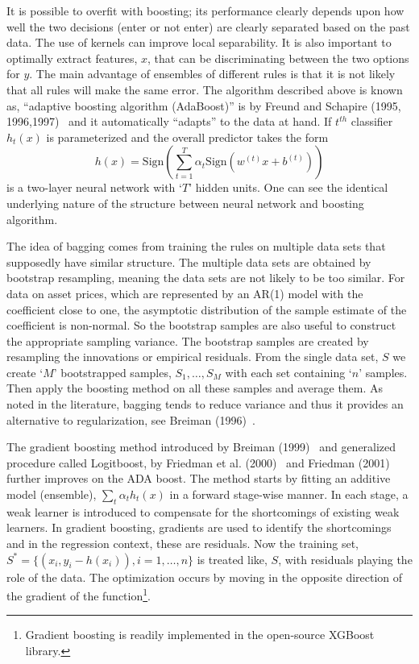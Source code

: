  
It is possible to overfit with boosting; its performance clearly depends upon how well the two decisions (enter or not enter) are clearly separated based on the past data. The use of kernels can improve local separability. It is also important to optimally extract features, $x$, that can be discriminating between the two options for $y$. The main advantage of ensembles of different rules is that it is not likely that all rules will make the same error. The algorithm described above is known as, ``adaptive boosting algorithm (AdaBoost)'' is by Freund and Schapire (1995, 1996,1997)~\cite{freund1995decision,freund1996experiments,freund1997decision} and it automatically ``adapts'' to the data at hand. If $t^{th}$ classifier $h_t(x)$ is parameterized and the overall predictor takes the form
	\begin{equation}
	h(x)=\text{Sign} \left( \sum_{t=1}^T \alpha_t \text{Sign}(w^{(t)}x+b^{(t)}) \right)
	\end{equation}
is a two-layer neural network with `$T$' hidden units. One can see the identical underlying nature of the structure between neural network and boosting algorithm.


The idea of bagging comes from training the rules on multiple data sets that supposedly have similar structure. The multiple data sets are obtained by bootstrap  resampling, meaning the data sets are not likely to be too similar. For data on asset prices, which are represented by an AR(1) model with the coefficient close to one, the asymptotic distribution of the sample estimate of the coefficient is non-normal. So the bootstrap samples are also useful to construct the appropriate sampling variance. The bootstrap samples are created by resampling the innovations or empirical residuals. From the single data set, $S$ we create `$M$' bootstrapped samples, $S_1, \ldots, S_M$ with each set containing `$n$' samples. Then apply the boosting method on all these samples and average them. As noted in the literature, bagging tends to reduce variance and thus it provides an alternative to regularization, see Breiman (1996)~\cite{breiman1996bagging}.\label{in:bagging_end}


The gradient boosting method introduced by Breiman (1999)~\cite{breiman1999prediction} and generalized procedure called Logitboost, by Friedman et al. (2000)~\cite{friedman2000additive} and Friedman (2001)~\cite{friedman2001greedy} further improves on the ADA boost. The method starts by fitting an additive model (ensemble), $\sum_t \alpha_t h_t (x)$ in a forward stage-wise manner. In each stage, a weak learner is introduced to compensate for the shortcomings of existing weak learners. In gradient boosting, gradients are used to identify the shortcomings and in the regression context, these are residuals. Now the training set, $S^*=\{ (x_i, y_i-h(x_i)) , i =1,\ldots,n \}$ is treated like, $S$, with residuals playing the role of the data. The optimization occurs by moving in the opposite direction of the gradient of the function\footnote{Gradient boosting is readily implemented in the open-source XGBoost library.}. \label{in:adv_model_end}



